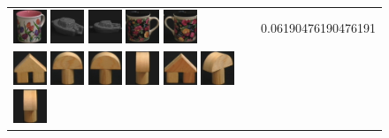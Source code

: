 \begin{figure}[tbp]
\begin{center}
\begin{tabular}{m{11cm} | m{3cm} |}
\includegraphics[width=1cm]{coil/beeld-9.eps}
\includegraphics[width=1cm]{coil/beeld-25.eps}
\includegraphics[width=1cm]{coil/beeld-24.eps}
\includegraphics[width=1cm]{coil/beeld-60.eps}
\includegraphics[width=1cm]{coil/beeld-61.eps}
& {\scriptsize 0.06190476190476191}
\\
\includegraphics[width=1cm]{coil/beeld-42.eps}
\includegraphics[width=1cm]{coil/beeld-0.eps}
\includegraphics[width=1cm]{coil/beeld-1.eps}
\includegraphics[width=1cm]{coil/beeld-5.eps}
\includegraphics[width=1cm]{coil/beeld-43.eps}
\includegraphics[width=1cm]{coil/beeld-3.eps}
\includegraphics[width=1cm]{coil/beeld-2.eps}

\end{tabular}
\end{center}
\end{figure}
